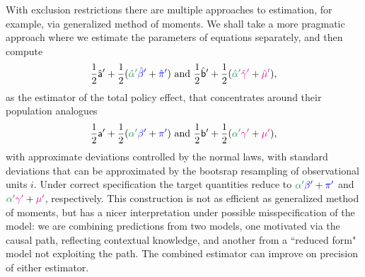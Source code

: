 \documentclass[11pt,reqno,letter]{amsart}
\theoremstyle{definition}
\def\bcolor{\color{ForestGreen}}
\def\pcolor{\color{blue}}
\def\icolor{\color{magenta}}
\begin{document}
With exclusion restrictions there are multiple approaches to estimation, for example,
via generalized method of moments. We shall take a more pragmatic approach where we estimate
the parameters of equations separately, and then compute
\begin{equation}
 \frac{1}{2} \hat {\mathsf{a}}'  + \frac{1}{2}  ( {\bcolor \hat \alpha '}  {\pcolor \hat \beta' }+{\pcolor\hat \pi'} ) \text{ and }
 \frac{1}{2} \hat{\mathsf{b}}'  + \frac{1}{2}  ( {\bcolor \hat \alpha '}  {\icolor \hat \gamma'} + {\icolor \hat \mu'}),
\end{equation}
as the estimator of the total policy effect, that concentrates around  their population analogues
\begin{equation}
 \frac{1}{2}  {\mathsf{a}}'  + \frac{1}{2}  ( {\bcolor \alpha '}  {\pcolor \beta' }+{\pcolor \pi'} ) \text{ and }
 \frac{1}{2} {\mathsf{b}}'  + \frac{1}{2}  ( {\bcolor  \alpha '}  {\icolor \gamma'} + {\icolor \mu'}),
\end{equation}
with approximate deviations controlled by the normal laws, with standard deviations that can be approximated by the bootsrap
resampling of observational units $i$. Under correct specification the target quantities
reduce to $  {\bcolor \alpha '}  {\pcolor  \beta' }+{\pcolor \pi'} $ and ${\bcolor  \alpha '}  {\icolor  \gamma'} + {\icolor  \mu'}$, respectively. This construction is not as efficient as generalized method of moments,
but has a nicer interpretation under possible misspecification of the model: we are combining predictions
from two models, one motivated via the causal path, reflecting contextual knowledge, and another from a ``reduced form" model not exploiting the path. The combined estimator can improve on precision of either estimator.
\end{document}
